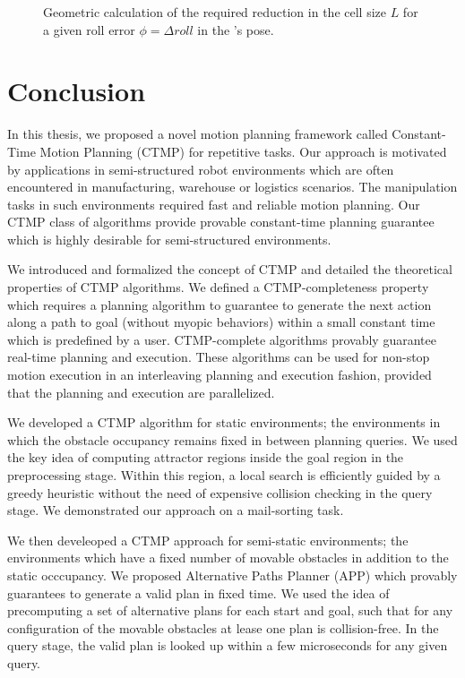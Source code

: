\documentclass[a4paper]{report}
\begin{document}
\begin{figure}[bt]
\centering
\caption{Geometric calculation of the required reduction in the cell size $L$ for a given roll error $\phi = \Delta roll$ in the \calS's pose.}
\label{fig:shield_r}
\end{figure}

\newpage

\chapter{Conclusion}
In this thesis, we proposed a novel motion planning framework called Constant-Time Motion Planning (CTMP) for repetitive tasks. Our approach is motivated by applications in semi-structured robot environments which are often encountered in manufacturing, warehouse or logistics scenarios. The manipulation tasks in such environments required fast and reliable motion planning. Our CTMP class of algorithms provide provable constant-time planning guarantee which is highly desirable for semi-structured environments.

We introduced and formalized the concept of CTMP and detailed the theoretical properties of CTMP algorithms. We defined a CTMP-completeness property which requires a planning algorithm to guarantee to generate the next action along a path to goal (without myopic behaviors) within a small constant time which is predefined by a user. CTMP-complete algorithms provably guarantee real-time planning and execution. These algorithms can be used for non-stop motion execution in an interleaving planning and execution fashion, provided that the planning and execution are parallelized.

We developed a CTMP algorithm for static environments; the environments in which the obstacle occupancy remains fixed in between planning queries. We used the key idea of computing attractor regions inside the goal region in the preprocessing stage. Within this region, a local search is efficiently guided by a greedy heuristic without the need of expensive collision checking in the query stage. We demonstrated our approach on a mail-sorting task.

We then develeoped a CTMP approach for semi-static environments; the environments which have a fixed number of movable obstacles in addition to the static occcupancy. We proposed Alternative Paths Planner (APP) which provably guarantees to generate a valid plan in fixed time. We used the idea of precomputing a set of alternative plans for each start and goal, such that for any configuration of the movable obstacles at lease one plan is collision-free. In the query stage, the valid plan is looked up within a few microseconds for any given query.
\end{document}
